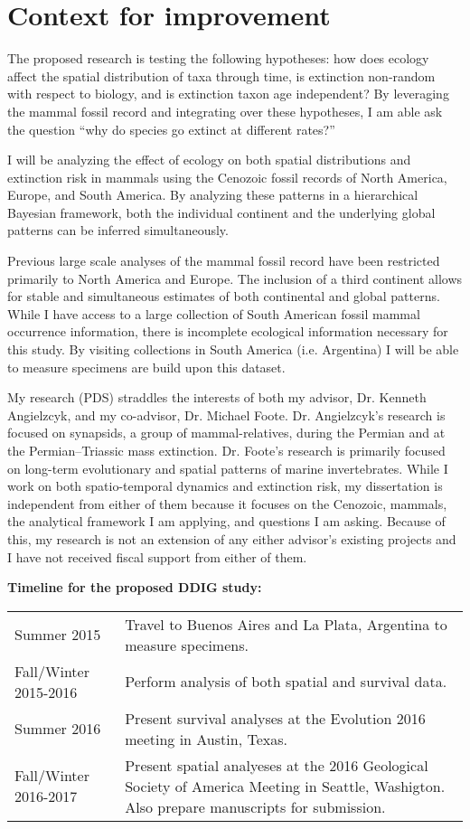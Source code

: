 \documentclass[11pt,letterpaper]{article}
\begin{document}
\setcounter{secnumdepth}{0}
\section{Context for improvement}

The proposed research is testing the following hypotheses: how does ecology affect the spatial distribution of taxa through time, is extinction non-random with respect to biology, and is extinction taxon age independent? By leveraging the mammal fossil record and integrating over these hypotheses, I am able ask the question ``why do species go extinct at different rates?'' 

I will be analyzing the effect of ecology on both spatial distributions and extinction risk in mammals using the Cenozoic fossil records of North America, Europe, and South America. By analyzing these patterns in a hierarchical Bayesian framework, both the individual continent and the underlying global patterns can be inferred simultaneously.

Previous large scale analyses of the mammal fossil record have been restricted primarily to North America and Europe. The inclusion of a third continent allows for stable and simultaneous estimates of both continental and global patterns. While I have access to a large collection of South American fossil mammal occurrence information, there is incomplete ecological information necessary for this study. By visiting collections in South America (i.e. Argentina) I will be able to measure specimens are build upon this dataset. 

My research (PDS) straddles the interests of both my advisor, Dr. Kenneth Angielzcyk, and my co-advisor, Dr. Michael Foote. Dr. Angielzcyk's research is focused on synapsids, a group of mammal-relatives, during the Permian and at the Permian--Triassic mass extinction. Dr. Foote's research is primarily focused on long-term evolutionary and spatial patterns of marine invertebrates. While I work on both spatio-temporal dynamics and extinction risk, my dissertation is independent from either of them because it focuses on the Cenozoic, mammals, the analytical framework I am applying, and questions I am asking. Because of this, my research is not an extension of any either advisor's existing projects and I have not received fiscal support from either of them.


\textbf{Timeline for the proposed DDIG study:}

\begin{tabular}[H]{l p{12cm}}
  Summer 2015 & Travel to Buenos Aires and La Plata, Argentina to measure specimens. \\
  Fall/Winter 2015-2016 & Perform analysis of both spatial and survival data. \\
  Summer 2016 & Present survival analyses at the Evolution 2016 meeting in Austin, Texas. \\
  Fall/Winter 2016-2017 & Present spatial analyeses at the 2016 Geological Society of America Meeting in Seattle, Washigton. Also prepare manuscripts for submission.
\end{tabular}
\end{document}
